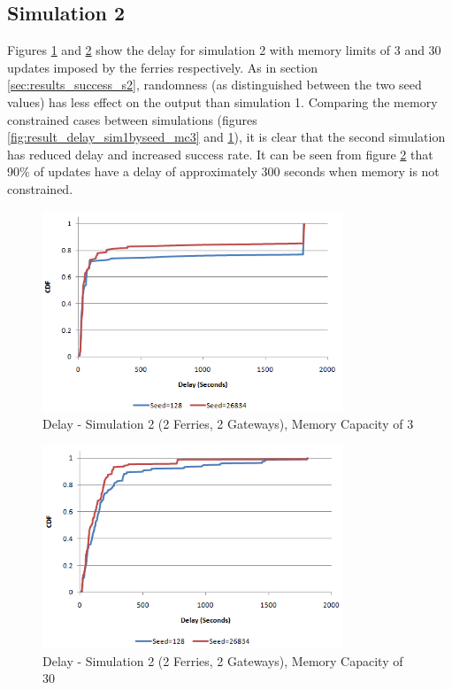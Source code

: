 \subsection{Simulation 2}

Figures \ref{fig:result_delay_sim2byseed_mc3} and \ref{fig:result_delay_sim2byseed_mc30} show the delay for simulation 2 with memory limits of 3 and 30 updates imposed by the ferries respectively.
As in section \ref{sec:results_success_s2}, randomness (as distinguished between the two seed values) has less effect on the output than simulation 1.
Comparing the memory constrained cases between simulations (figures \ref{fig:result_delay_sim1byseed_mc3} and \ref{fig:result_delay_sim2byseed_mc3}), it is clear that the second simulation has reduced delay and increased success rate.
It can be seen from figure \ref{fig:result_delay_sim2byseed_mc30} that 90\% of updates have a delay of approximately 300 seconds when memory is not constrained.

\begin{figure}[htbp]
    \centering
    \includegraphics[width=0.8\textwidth]{images/result_delay_sim2byseed_mc3.png}
    \caption{Delay - Simulation 2 (2 Ferries, 2 Gateways), Memory Capacity of 3}
    \label{fig:result_delay_sim2byseed_mc3}
\end{figure}


\begin{figure}[htbp]
    \centering
    \includegraphics[width=0.8\textwidth]{images/result_delay_sim2byseed_mc30.png}
    \caption{Delay - Simulation 2 (2 Ferries, 2 Gateways), Memory Capacity of 30}
    \label{fig:result_delay_sim2byseed_mc30}
\end{figure}

